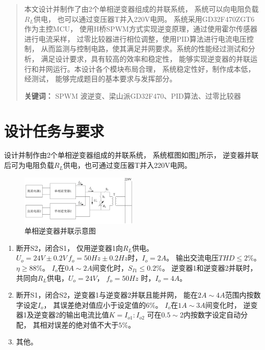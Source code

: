 \documentclass[a4paper,12pt]{article}
\begin{document}



\newpage
\begin{abstract}
本文设计并制作了由2个单相逆变器组成的并联系统，
系统可以向电阻负载$R_L$供电，
也可以通过变压器T并入220V电网。
系统采用GD32F470ZGT6作为主控MCU，
使用H桥SPWM方式实现逆变原理，通过使用霍尔传感器进行电流采样，
过零比较器进行相位调整，使用PID算法进行电流电压控制，
从而监测与控制电路，使其满足并网要求。系统的性能经过测试和分析，
满足设计要求，具有较高的效率和稳定性，
能够实现逆变器的并联运行和并网运行。本设计各个模块布局合理，
系统稳定性好，制作成本低，经测试，
能够完成题目的基本要求与发挥部分。


\noindent \textbf{关键词：} 
SPWM 波逆变、梁山派GD32F470、PID算法、过零比较器
\end{abstract}

\newpage

\tableofcontents

\newpage

\section{设计任务与要求}
设计并制作由2个单相逆变器组成的并联系统，
系统框图如图\ref{fig1}所示，
逆变器并联后可为电阻负载$R_L$供电，也可通过变压器T并入220V电网。
\begin{figure}[htbp]
\centering
\includegraphics[width=0.5\textwidth]{src/fig1.png}
\caption{单相逆变器并联示意图}
\label{fig1}
\end{figure}
\begin{enumerate}
    \item 断开S2，闭合S1，
    仅用逆变器1向$R_L$供电。$U_o=24V\pm0.2V\  f_o=50Hz\pm0.2Hz$时，$I_o=2A$。
    输出交流电压$THD\leqslant 2\%$。$\eta\geqslant 88\%$。
    $I_o$在$0A\sim 2A$间变化时，$S_{I1}\leqslant 0.2\%$。
    逆变器1和逆变器2并联时，
    共同向$R_L$供电，$U_o=24V$， $f_o=50Hz$ 时，$I_o=4A$。
    \item 断开S1，闭合S2，逆变器1与逆变器2并联且能并网，
    能在$2A\sim4A$范围内按数字设定$I_o$，
    其误差绝对值应小于设定值的$6\%$。
    $I_o$在$1A\sim 3A$间变化时，
    逆变器1及逆变器2的输出电流比值$K=I_{o1}:I_{o2}$
    可在$0.5\sim 2$内按数字设定自动分配，
    其相对误差的绝对值不大于$5\%$。
    \item 其他。
\end{enumerate}
\end{document}

